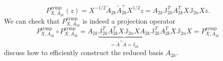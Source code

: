 \begin{equation} \label{p1.eq:nommor.0.11}
	P_{X,A_{2k}}^\text{symp}(z) = X^{-1/2} \tilde A_{2k} \tilde A_{2k}^+ X^{1/2} z = A_{2k} \mathbb J_{2k}^T A_{2k}^T X \mathbb J_{2n} X z.
\end{equation}
We can check that $P_{X,A_{2k}}^{\text{symp}}$ is indeed a projection operator
\begin{equation} \label{p1.eq:nommor.0.12}
	P_{X,A_{2k}}^\text{symp} \circ P_{X,A_{2k}}^\text{symp} = A_{2k} \underbrace{ \mathbb J_{2k}^T A_{2k}^T X \mathbb J_{2n} X A_{2k}}_{ =\tilde A^+ \tilde A = I_{2k} } \mathbb J_{2k}^T A_{2k}^T X \mathbb J_{2n} X = P_{X,A_{2k}}^\text{symp} 
\end{equation}
 discuss how to efficiently construct the reduced basis $A_{2k}$.

